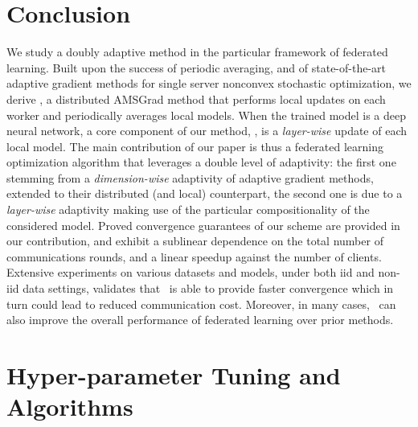 \documentclass[manuscript,screen,review]{acmart}
\begin{document}
\section{Conclusion}\label{sec:conclusion}

We study a doubly adaptive method in the particular framework of federated learning.
Built upon the success of periodic averaging, and of state-of-the-art adaptive gradient methods for single server nonconvex stochastic optimization, we derive \algo, a distributed AMSGrad method that performs local updates on each worker and periodically averages local models. 
When the trained model is a deep neural network, a core component of our method, \algo, is a \emph{layer-wise} update of each local model.
The main contribution of our paper is thus a federated learning optimization algorithm that leverages a double level of adaptivity: the first one stemming from a \emph{dimension-wise} adaptivity of adaptive gradient methods, extended to their distributed (and local) counterpart, the second one is due to a  \emph{layer-wise} adaptivity making use of the particular compositionality of the considered model.
Proved convergence guarantees of our scheme are provided in our contribution, and exhibit a sublinear dependence on the total number of communications rounds, and a linear speedup against the number of clients. Extensive experiments on various datasets and models, under both iid and non-iid data settings, validates that \algo\ is able to provide faster convergence  which in turn could lead to reduced communication cost. Moreover, in many cases, \algo\ can also improve the overall performance of federated learning over prior methods.




\clearpage






\clearpage

 \appendix 


 \onecolumn

   \hsize\textwidth
   \linewidth{}
 
  \vspace{0.5in}
 
 



\section{Hyper-parameter Tuning and Algorithms} \label{app:experiment}
\end{document}
